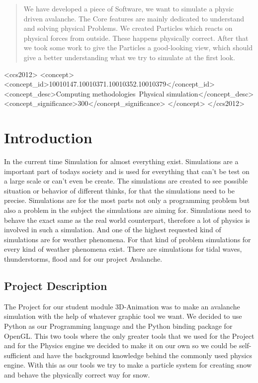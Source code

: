 \documentclass{sig-alternate-05-2015}
\begin{document}
\begin{abstract}
We have developed a piece of Software, we want to simulate a physic driven avalanche. The Core features are mainly dedicated to understand and solving physical Problems. We created Particles which reacts on physical forces from outside. These happens physically correct. After that we took some work to give the Particles a good-looking view, which should give a better understanding what we try to simulate at the first look. \\

\end{abstract}


\begin{CCSXML}
<ccs2012>
<concept>
<concept_id>10010147.10010371.10010352.10010379</concept_id>
<concept_desc>Computing methodologies~Physical simulation</concept_desc>
<concept_significance>300</concept_significance>
</concept>
</ccs2012>
\end{CCSXML}





\section{Introduction}
In the current time Simulation for almost everything exist. Simulations are a important part of todays society and is used for everything that can’t be test on a large scale or can’t even be create. The simulations are created to see possible situation or behavior of different thinks, for that the simulations need to be precise. Simulations are for the most parts not only a programming problem but also a problem in the subject the simulations are aiming for. Simulations need to behave the exact same as the real world counterpart, therefore a lot of physics is involved in such a simulation. And one of the highest requested kind of simulations are for weather phenomena. For that kind of problem simulations for every kind of weather phenomena exist. There are simulations for tidal waves, thunderstorms, flood and for our project Avalanche.
\subsection{Project Description}
The Project for our student module 3D-Animation was to make an avalanche simulation with the help of whatever graphic tool we want. We decided to use Python as our Programming language and the Python binding package for OpenGL. This two tools where the only greater tools that we used for the Project and for the Physics engine we decided to make it on our own so we could be self-sufficient and have the background knowledge behind the commonly used physics engine. With this as our tools we try to make a particle system for creating snow and behave the physically correct way for snow.
\end{document}
